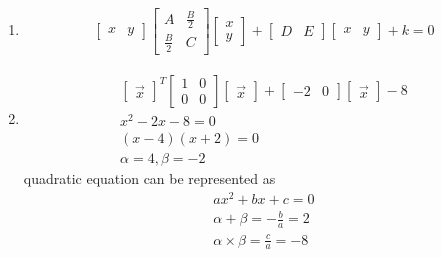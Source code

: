 \renewcommand{\theequation}{\theenumi}
\begin{enumerate}[label=\arabic*.,ref=\thesubsection.\theenumi]
\item 
\begin{align}
\begin{bmatrix}x & y\end{bmatrix}\begin{bmatrix}A & \frac{B}{2}\\\frac{B}{2} & C\end{bmatrix}\begin{bmatrix}x \\ y\end{bmatrix} + \begin{bmatrix}D & E\end{bmatrix}\begin{bmatrix}x & y\end{bmatrix} +k =0
\end{align}

\item
\begin{align}
\begin{bmatrix}\vec x\end{bmatrix}^T\begin{bmatrix}1 & 0\\0 & 0\end{bmatrix}\begin{bmatrix}\vec x\end{bmatrix} + \begin{bmatrix}-2 & 0\end{bmatrix}\begin{bmatrix}\vec x\end{bmatrix} -8 
\\
x^2-2x-8 = 0
\\
\left(x-4\right)\left(x+2\right) = 0
\\
\alpha = 4 ,\beta =-2 
\end{align}
quadratic equation can be represented as 
\begin{align}
ax^2+bx +c = 0
\\
\alpha +\beta = -\frac{b}{a} = 2
\\
\alpha \times \beta = \frac{c}{a} = -8
\end{align}


\end{enumerate}
